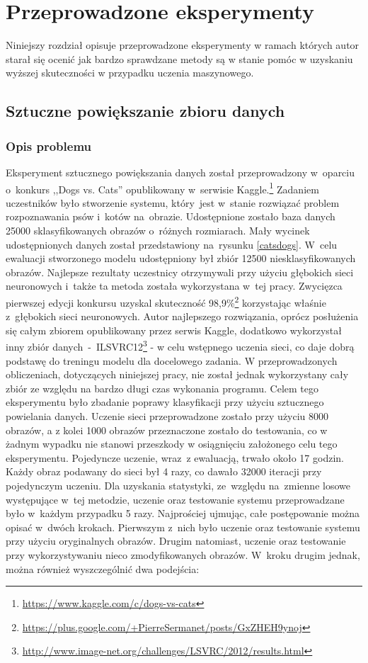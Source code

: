 \section{Przeprowadzone eksperymenty} \label{results}
Niniejszy rozdział opisuje przeprowadzone eksperymenty w ramach których autor starał się ocenić jak bardzo sprawdzane metody są w stanie pomóc w uzyskaniu wyższej skuteczności w przypadku uczenia maszynowego. 

\subsection{Sztuczne powiększanie zbioru danych}
\subsubsection{Opis problemu}
Eksperyment sztucznego powiększania danych został przeprowadzony w~oparciu o~konkurs ,,Dogs vs. Cats'' opublikowany w~serwisie Kaggle.\footnote{\label{myfootnote1}\url{https://www.kaggle.com/c/dogs-vs-cats}} Zadaniem uczestników było stworzenie systemu, który~jest w~stanie rozwiązać problem rozpoznawania psów i~kotów na~obrazie. Udostępnione zostało baza danych 25000 sklasyfikowanych obrazów o~różnych rozmiarach. Mały wycinek udostępnionych danych został przedstawiony na~rysunku \ref{catsdogs}. W~celu ewaluacji stworzonego modelu udostępniony był zbiór 12500 niesklasyfikowanych obrazów. Najlepsze rezultaty uczestnicy otrzymywali przy użyciu głębokich sieci neuronowych i~także ta metoda została wykorzystana w~tej pracy. Zwycięzca pierwszej edycji konkursu uzyskal skuteczność 98,9\%\footnote{\label{myfootnote2}\url{https://plus.google.com/+PierreSermanet/posts/GxZHEH9ynoj}} korzystając właśnie z~głębokich sieci neuronowych. Autor najlepszego rozwiązania, oprócz posłużenia się całym zbiorem opublikowany przez serwis Kaggle, dodatkowo wykorzystał inny zbiór danych~-~ILSVRC12\footnote{\url{http://www.image-net.org/challenges/LSVRC/2012/results.html}} - w celu wstępnego uczenia sieci, co daje dobrą podstawę do treningu modelu dla docelowego zadania. W przeprowadzonych obliczeniach, dotyczących niniejszej pracy, nie został jednak wykorzystany cały zbiór ze względu na bardzo długi czas wykonania programu. Celem tego eksperymentu było zbadanie poprawy klasyfikacji przy użyciu sztucznego powielania danych. Uczenie sieci przeprowadzone zostało przy użyciu 8000 obrazów, a z kolei 1000 obrazów przeznaczone zostało do testowania, co w żadnym wypadku nie stanowi przeszkody w osiągnięciu założonego celu tego eksperymentu. Pojedyncze uczenie, wraz~z ewaluacją, trwało około 17 godzin. Każdy obraz podawany do sieci był 4 razy, co dawało 32000 iteracji przy pojedynczym uczeniu. Dla uzyskania statystyki, ze~względu na~zmienne losowe występujące w~tej metodzie, uczenie oraz testowanie systemu przeprowadzane było w~każdym przypadku 5 razy. Najprościej ujmując, całe postępowanie można opisać w~dwóch krokach. Pierwszym z~nich było uczenie oraz testowanie systemu przy użyciu oryginalnych obrazów. Drugim natomiast, uczenie oraz testowanie przy wykorzystywaniu nieco zmodyfikowanych obrazów. W~kroku drugim jednak, można również wyszczególnić dwa podejścia:
